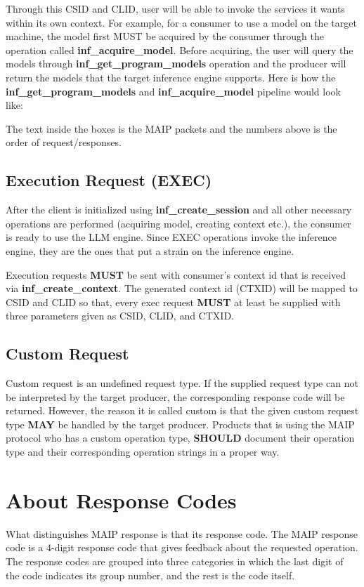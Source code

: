 \documentclass{article}
\begin{document}
Through this CSID and CLID, user will be able to invoke the services it wants within its own context. For example, for a consumer to use a model on the target machine, the model first MUST be acquired by the consumer through the operation called \textbf{inf\_acquire\_model}. Before acquiring, the user will query the models through \textbf{inf\_get\_program\_models} operation and the producer will return the models that the target inference engine supports. Here is how the \textbf{inf\_get\_program\_models} and \textbf{inf\_acquire\_model} pipeline would look like:\newline

The text inside the boxes is the MAIP packets and the numbers above is the order of request/responses.\newline

\subsection{Execution Request (EXEC)}
After the client is initialized using \textbf{inf\_create\_session} and all other necessary operations are performed (acquiring model, creating context etc.), the consumer is ready to use the LLM engine. Since EXEC operations invoke the inference engine, they are the ones that put a strain on the inference engine.\newline

Execution requests \textbf{MUST} be sent with consumer's context id that is received via \textbf{inf\_create\_context}. The generated context id (CTXID) will be mapped to CSID and CLID so that, every exec request \textbf{MUST} at least be supplied with three parameters given as CSID, CLID, and CTXID.\newline

\subsection{Custom Request}
Custom request is an undefined request type. If the supplied request type can not be interpreted by the target producer, the corresponding response code will be returned. However, the reason it is called custom is that the given custom request type \textbf{MAY} be handled by the target producer. Products that is using the MAIP protocol who has a custom operation type, \textbf{SHOULD} document their operation type and their corresponding operation strings in a proper way.\newline

\section{About Response Codes}
What distinguishes MAIP response is that its response code. The MAIP response code is a 4-digit response code that gives feedback about the requested operation. The response codes are grouped into three categories in which the last digit of the code indicates its group number, and the rest is the code itself.
\end{document}
